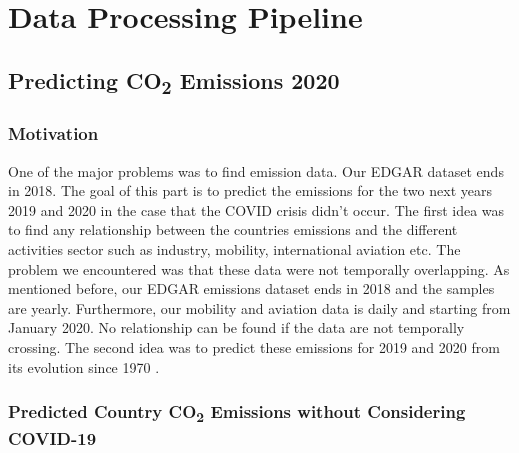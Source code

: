 \section{Data Processing Pipeline}

\subsection{Predicting CO\textsubscript{2} Emissions 2020}
\subsubsection{Motivation}
One of the major problems was to find emission data. Our EDGAR dataset ends in 2018. The goal of this part is to predict the emissions for the two next years 2019 and 2020 in the case that the COVID crisis didn't occur. The first idea was to find any relationship between the countries \co emissions and the different activities sector such as industry, mobility, international aviation etc.
The problem we encountered was that these data were not temporally overlapping. As mentioned before, our EDGAR emissions dataset ends in 2018 and the samples are yearly. Furthermore, our mobility and aviation data is daily and starting from January 2020. No relationship can be found if the data are not temporally crossing. The second idea was to predict these emissions for 2019 and 2020 from its evolution since 1970 .
\subsubsection{Predicted Country CO\textsubscript{2} Emissions without Considering COVID-19}

